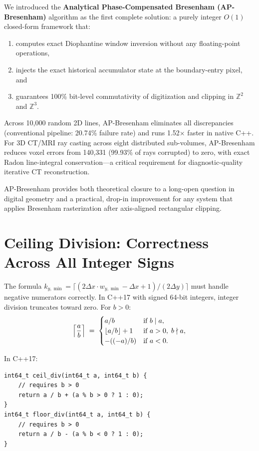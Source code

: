 \documentclass[12pt,a4paper]{article}
\theoremstyle{definition}
\newcommand{\Zt}{\mathbb{Z}^2}
\newcommand{\Zth}{\mathbb{Z}^3}
\newcommand{\dx}{\Delta x}
\newcommand{\dy}{\Delta y}
\begin{document}
We introduced the \textbf{Analytical Phase-Compensated
Bresenham (AP-Bresenham)} algorithm as the first complete
solution: a purely integer $O(1)$ closed-form framework
that:
\begin{enumerate}
  \item[(i)] computes exact Diophantine window inversion
    without any floating-point operations,
  \item[(ii)] injects the exact historical accumulator
    state at the boundary-entry pixel, and
  \item[(iii)] guarantees 100\% bit-level commutativity
    of digitization and clipping in $\Zt$ and $\Zth$.
\end{enumerate}

Across 10,000 random 2D lines, AP-Bresenham eliminates
all discrepancies (conventional pipeline: 20.74\% failure
rate) and runs 1.52$\times$ faster in native C++. For 3D
CT/MRI ray casting across eight distributed sub-volumes,
AP-Bresenham reduces voxel errors from 140,331 (99.93\%
of rays corrupted) to zero, with exact Radon line-integral
conservation---a critical requirement for diagnostic-quality
iterative CT reconstruction.

AP-Bresenham provides both theoretical closure to a
long-open question in digital geometry and a practical,
drop-in improvement for any system that applies Bresenham
rasterization after axis-aligned rectangular clipping.

\appendix
\renewcommand{\thesection}{A}
\section{Ceiling Division: Correctness Across All Integer Signs}
\label{app:ceiling}

The formula $k_{y,\min} = \lceil(2\dx\cdot w_{y,\min}
- \dx + 1)/(2\dy)\rceil$ must handle negative numerators
correctly. In C++17 with signed 64-bit integers, integer
division truncates toward zero. For $b > 0$:
\[
  \Bigl\lceil \frac{a}{b} \Bigr\rceil \;=\;
  \begin{cases}
    a / b & \text{if } b \mid a,\\
    \lfloor a/b \rfloor + 1 & \text{if } a > 0,\; b \nmid a,\\
    -((-a) / b) & \text{if } a < 0.
  \end{cases}
\]

In C++17:
\begin{lstlisting}
int64_t ceil_div(int64_t a, int64_t b) {
    // requires b > 0
    return a / b + (a % b > 0 ? 1 : 0);
}
int64_t floor_div(int64_t a, int64_t b) {
    // requires b > 0
    return a / b - (a % b < 0 ? 1 : 0);
}
\end{lstlisting}
\end{document}
